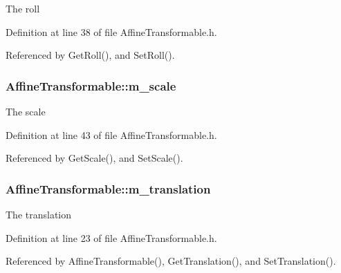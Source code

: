 The roll 



Definition at line 38 of file Affine\+Transformable.\+h.



Referenced by Get\+Roll(), and Set\+Roll().

\subsubsection[{\texorpdfstring{m\+\_\+scale}{m_scale}}]{ Affine\+Transformable\+::m\+\_\+scale\hspace{0.3cm}{\ttfamily [private]}}\hypertarget{class_affine_transformable_ac332af15336f089337fd31d7b3996bad}{}\label{class_affine_transformable_ac332af15336f089337fd31d7b3996bad}


The scale 



Definition at line 43 of file Affine\+Transformable.\+h.



Referenced by Get\+Scale(), and Set\+Scale().

\subsubsection[{\texorpdfstring{m\+\_\+translation}{m_translation}}]{ Affine\+Transformable\+::m\+\_\+translation\hspace{0.3cm}{\ttfamily [private]}}\hypertarget{class_affine_transformable_a3573983127e380c3d9151c32b43d199d}{}\label{class_affine_transformable_a3573983127e380c3d9151c32b43d199d}


The translation 



Definition at line 23 of file Affine\+Transformable.\+h.



Referenced by Affine\+Transformable(), Get\+Translation(), and Set\+Translation().


